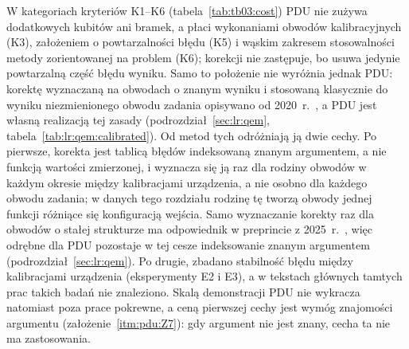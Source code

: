 W kategoriach kryteriów K1--K6 (tabela~\ref{tab:tb03:cost}) PDU nie zużywa dodatkowych kubitów ani bramek, a płaci wykonaniami obwodów kalibracyjnych (K3), założeniem o powtarzalności błędu (K5) i wąskim zakresem stosowalności metody zorientowanej na problem (K6); korekcji nie zastępuje, bo usuwa jedynie powtarzalną część błędu wyniku.
Samo to położenie nie wyróżnia jednak PDU: korektę wyznaczaną na obwodach o znanym wyniku i stosowaną klasycznie do wyniku niezmienionego obwodu zadania opisywano od 2020~r.~\cite{jattana_general_2020,czarnik_error_2021,urbanek_mitigating_2021,lolur_reference-state_2023}, a PDU jest własną realizacją tej zasady (podrozdział~\ref{sec:lr:qem}, tabela~\ref{tab:lr:qem:calibrated}).
Od metod tych odróżniają ją dwie cechy.
Po pierwsze, korekta jest tablicą błędów indeksowaną znanym argumentem, a nie funkcją wartości zmierzonej, i wyznacza się ją raz dla rodziny obwodów w każdym okresie między kalibracjami urządzenia, a nie osobno dla każdego obwodu zadania; w danych tego rozdziału rodzinę tę tworzą obwody jednej funkcji różniące się konfiguracją wejścia.
Samo wyznaczanie korekty raz dla obwodów o stałej strukturze ma odpowiednik w preprincie z 2025~r.~\cite{shen_circuit_2025}, więc odrębne dla PDU pozostaje w tej cesze indeksowanie znanym argumentem (podrozdział~\ref{sec:lr:qem}).
Po drugie, zbadano stabilność błędu między kalibracjami urządzenia (eksperymenty E2 i E3), a w tekstach głównych tamtych prac takich badań nie znaleziono.
Skalą demonstracji PDU nie wykracza natomiast poza prace pokrewne, a ceną pierwszej cechy jest wymóg znajomości argumentu (założenie~\ref{itm:pdu:Z7}): gdy argument nie jest znany, cecha ta nie ma zastosowania.

